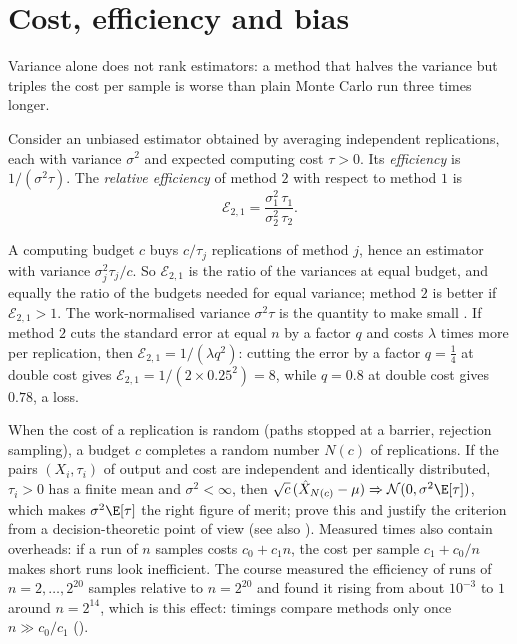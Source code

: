 \section{Cost, efficiency and bias}\label{sec:mc-efficiency}

Variance alone does not rank estimators: a method that halves the variance but triples
the cost per sample is worse than plain Monte Carlo run three times longer.

\begin{definition}[Efficiency]\label{def:mc-efficiency}
Consider an unbiased estimator obtained by averaging independent replications, each with
variance $\sigma^2$ and expected computing cost $\tau>0$. Its \emph{efficiency} is
$1/(\sigma^2\tau)$. The \emph{relative efficiency} of method $2$ with respect to method $1$
is
\[
  \mathcal E_{2,1}=\frac{\sigma_1^2\,\tau_1}{\sigma_2^2\,\tau_2}.
\]
\end{definition}

A computing budget $c$ buys $c/\tau_j$ replications of method $j$, hence an estimator with
variance $\sigma_j^2\tau_j/c$. So $\mathcal E_{2,1}$ is the ratio of the variances at equal
budget, and equally the ratio of the budgets needed for equal variance; method $2$ is
better if $\mathcal E_{2,1}>1$. The work-normalised variance $\sigma^2\tau$ is the quantity to
make small \citep[Section~1.1.3]{glasserman-mc}. If method $2$ cuts the standard error at
equal $n$ by a factor $q$ and costs $\lambda$ times more per replication, then
$\mathcal E_{2,1}=1/(\lambda q^2)$: cutting the error by a factor $q=\frac14$ at double cost
gives $\mathcal E_{2,1}=1/(2\times0.25^2)=8$, while $q=0.8$ at double cost gives $0.78$, a
loss.

\begin{remark}\label{rem:mc-budget}
When the cost of a replication is random (paths stopped at a barrier, rejection sampling),
a budget $c$ completes a random number $N(c)$ of replications. If the pairs $(X_i,\tau_i)$
of output and cost are independent and identically distributed, $\tau_i>0$ has a finite
mean and $\sigma^2<\infty$, then
$\sqrt c\,(\hat X_{N(c)}-\mu)\Rightarrow\mathcal N(0,\sigma^2\E[\tau])$, which makes
$\sigma^2\E[\tau]$ the right figure of merit; \textcite{glynn-whitt} prove this and justify
the criterion from a decision-theoretic point of view (see also \citet[Section~III.10]{asmussen-glynn}).
Measured times also contain overheads: if a run of $n$ samples costs $c_0+c_1n$, the cost per
sample $c_1+c_0/n$ makes short runs look inefficient. The course measured the efficiency
of runs of $n=2,\dots,2^{20}$ samples relative to $n=2^{20}$ and found it rising from about
$10^{-3}$ to $1$ around $n=2^{14}$, which is this effect: timings compare methods only once
$n\gg c_0/c_1$ ().
\end{remark}

